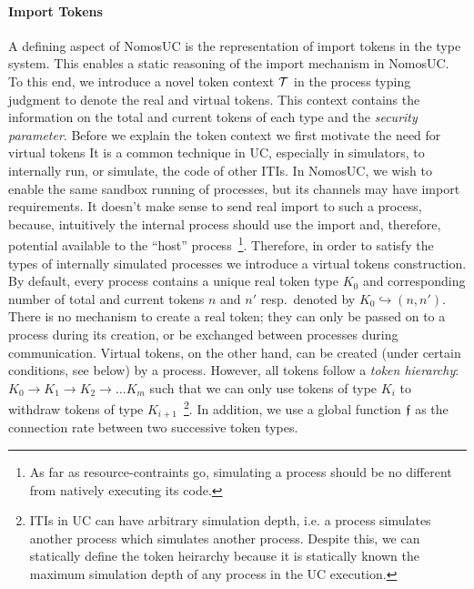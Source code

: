 \paragraph*{\textbf{Import Tokens}}
A defining aspect of NomosUC is the representation of import tokens in the type system.
This enables a static reasoning of the import mechanism in NomosUC.
To this end, we introduce a novel token context $\mathcal{T}$
in the process typing judgment to denote the real and virtual tokens.
This context contains the information on the total and current tokens
of each type and the \emph{security parameter}.
Before we explain the token context we first motivate the need for virtual tokens
It is a common technique in UC, especially in simulators, to internally run, or simulate, 
the code of other ITIs. In NomosUC, we wish to enable the same sandbox running of processes,
but its channels may have import requirements. It doesn't make sense to
send real import to such a process, because, intuitively the internal process should use the
import and, therefore, potential available to the ``host'' process~\footnote{As far as resource-contraints go, simulating a process should be no different from natively executing its code.}. Therefore, in 
order to satisfy the types of internally simulated processes we introduce a virtual 
tokens construction. 
By default, every process contains a unique real token type $K_0$
and corresponding number of total and current tokens $n$ and $n'$ resp.\
denoted by $K_0 \hookrightarrow (n, n')$.
There is no mechanism to create a real token; they can only be passed on to
a process during its creation, or be exchanged between processes during communication.
Virtual tokens, on the other hand, can be created (under certain conditions,
see below) by a process.
However, all tokens follow a \emph{token hierarchy}: $K_0 \to K_1 \to K_2 \to \ldots K_m$
such that we can only use tokens of type $K_i$ to withdraw tokens of type
$K_{i+1}$~\footnote{ITIs in UC can have arbitrary simulation depth, i.e. a process simulates another process which simulates another process. Despite this, we can statically define the token heirarchy because it is statically known the maximum simulation depth of any process in the UC execution.}.
In addition, we use a global function $\mathfrak{f}$ as the connection
rate between two successive token types.

